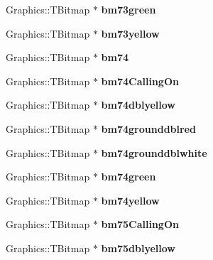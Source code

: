\begin{DoxyCompactItemize}
Graphics\+::\+T\+Bitmap $\ast$ {\bfseries bm73green}
\item 
\mbox{\label{class_t_rail_graphics_a2f8fc1bed95f6d3bcae6ced0ef7adf66}} 
Graphics\+::\+T\+Bitmap $\ast$ {\bfseries bm73yellow}
\item 
\mbox{\label{class_t_rail_graphics_a5f501c2042a79d70aee00ca3964c57f6}} 
Graphics\+::\+T\+Bitmap $\ast$ {\bfseries bm74}
\item 
\mbox{\label{class_t_rail_graphics_a4dd85ea1425d87982eb47b47ee45110a}} 
Graphics\+::\+T\+Bitmap $\ast$ {\bfseries bm74\+Calling\+On}
\item 
\mbox{\label{class_t_rail_graphics_ac6b7f061cea8ba5374cec3a45b2bc8db}} 
Graphics\+::\+T\+Bitmap $\ast$ {\bfseries bm74dblyellow}
\item 
\mbox{\label{class_t_rail_graphics_a3ac052156b16b58d1415045405887650}} 
Graphics\+::\+T\+Bitmap $\ast$ {\bfseries bm74grounddblred}
\item 
\mbox{\label{class_t_rail_graphics_aa7beb045e776e4487131f1270152d8f6}} 
Graphics\+::\+T\+Bitmap $\ast$ {\bfseries bm74grounddblwhite}
\item 
\mbox{\label{class_t_rail_graphics_a7809da901d3a3c4d8c8a1f7904f3a6cf}} 
Graphics\+::\+T\+Bitmap $\ast$ {\bfseries bm74green}
\item 
\mbox{\label{class_t_rail_graphics_a5288b859e987ca132d045ca6178891ee}} 
Graphics\+::\+T\+Bitmap $\ast$ {\bfseries bm74yellow}
\item 
\mbox{\label{class_t_rail_graphics_a281b9ba7eedf15f121bfd7e41b57b960}} 
Graphics\+::\+T\+Bitmap $\ast$ {\bfseries bm75\+Calling\+On}
\item 
\mbox{\label{class_t_rail_graphics_a3658fe4671d4783e60af21e94b73eb84}} 
Graphics\+::\+T\+Bitmap $\ast$ {\bfseries bm75dblyellow}
\item 
\mbox{\label{class_t_rail_graphics_ae1a40ed18c9c79df2057a5d6801ac980}} 

\end{DoxyCompactItemize}
